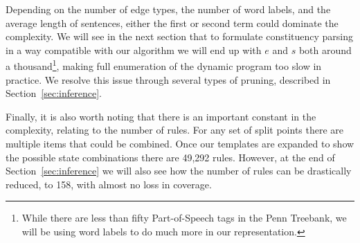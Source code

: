 Depending on the number of edge types, the number of word labels, and the average length of sentences, either the first or second term could dominate the complexity.
We will see in the next section that to formulate constituency parsing in a way compatible with our algorithm we will end up with $e$ and $s$ both around a thousand\footnote{
While there are less than fifty Part-of-Speech tags in the Penn Treebank, we will be using word labels to do much more in our representation.
}, making full enumeration of the dynamic program too slow in practice.
We resolve this issue through several types of pruning, described in Section~\ref{sec:inference}.

Finally, it is also worth noting that there is an important constant in the complexity, relating to the number of rules.
For any set of split points there are multiple items that could be combined.
Once our templates are expanded to show the possible state combinations there are 49,292 rules.
However, at the end of Section~\ref{sec:inference} we will also see how the number of rules can be drastically reduced, to 158, with almost no loss in coverage.

